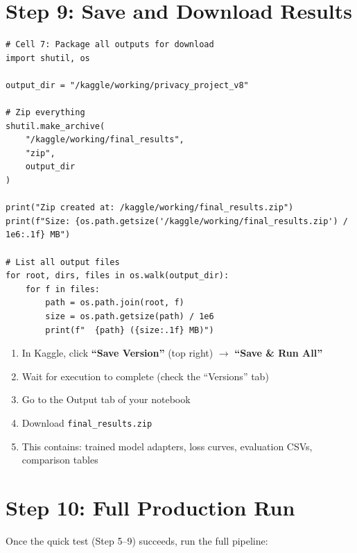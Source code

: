 \documentclass[11pt, a4paper]{article}
\begin{document}
\section{Step 9: Save and Download Results}

\begin{lstlisting}[style=python]
# Cell 7: Package all outputs for download
import shutil, os

output_dir = "/kaggle/working/privacy_project_v8"

# Zip everything
shutil.make_archive(
    "/kaggle/working/final_results",
    "zip",
    output_dir
)

print("Zip created at: /kaggle/working/final_results.zip")
print(f"Size: {os.path.getsize('/kaggle/working/final_results.zip') / 1e6:.1f} MB")

# List all output files
for root, dirs, files in os.walk(output_dir):
    for f in files:
        path = os.path.join(root, f)
        size = os.path.getsize(path) / 1e6
        print(f"  {path} ({size:.1f} MB)")
\end{lstlisting}

\begin{step}
\begin{enumerate}
    \item In Kaggle, click \textbf{``Save Version''} (top right) $\rightarrow$ \textbf{``Save \& Run All''}
    \item Wait for execution to complete (check the ``Versions'' tab)
    \item Go to the Output tab of your notebook
    \item Download \texttt{final\_results.zip}
    \item This contains: trained model adapters, loss curves, evaluation CSVs, comparison tables
\end{enumerate}
\end{step}

\section{Step 10: Full Production Run}

Once the quick test (Step 5--9) succeeds, run the full pipeline:
\end{document}
